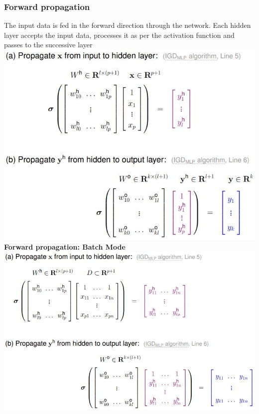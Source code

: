 \documentclass[11pt,a4paper]{article}
\begin{document}
\begin{flushleft}
\subsubsection{Forward propagation}
The input data is fed in the forward direction through the network. Each hidden layer accepts the input data, processes it as per the activation function and passes to the successive layer
\includegraphics[width= \textwidth]{forwardProp}
\textbf{Forward propagation: Batch Mode}
\includegraphics[width= \textwidth]{forwardPropBatch}

\end{flushleft}
\end{document}
